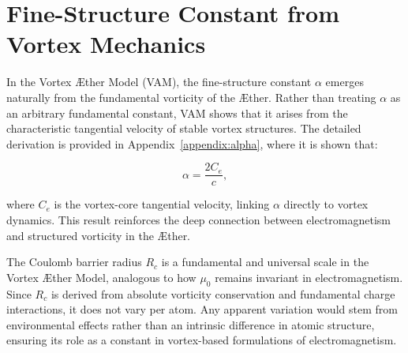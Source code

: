 

\section{Fine-Structure Constant from Vortex Mechanics}

In the Vortex \AE ther Model (VAM), the fine-structure constant $\alpha$ emerges naturally from the fundamental vorticity of the \AE ther. Rather
than treating $\alpha$ as an arbitrary fundamental constant, VAM shows that it arises from the characteristic tangential velocity of stable vortex
structures. The detailed derivation is provided in Appendix~\ref{appendix:alpha}, where it is shown that:

\begin{equation}
    \alpha = \frac{2 C_e}{c},
\end{equation}

where $C_e$ is the vortex-core tangential velocity, linking $\alpha$ directly to vortex dynamics. This result reinforces the deep connection between electromagnetism and structured vorticity in the \AE ther.


The Coulomb barrier radius \(R_c\) is a fundamental and universal scale in the Vortex Æther Model, analogous to how \(\mu_0\) remains invariant in electromagnetism. Since \(R_c\) is derived from absolute vorticity conservation and fundamental charge interactions, it does not vary per atom. Any apparent variation would stem from environmental effects rather than an intrinsic difference in atomic structure, ensuring its role as a constant in vortex-based formulations of electromagnetism.